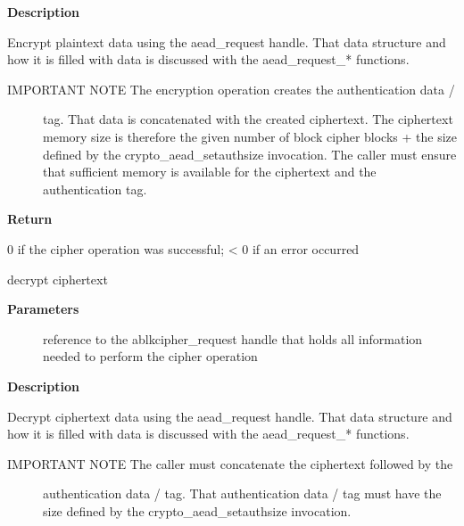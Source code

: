 \documentclass[a4paper,8pt,english]{sphinxmanual}
\begin{document}
\textbf{Description}

Encrypt plaintext data using the aead\_request handle. That data structure
and how it is filled with data is discussed with the aead\_request\_*
functions.
\begin{description}
\item[{IMPORTANT NOTE The encryption operation creates the authentication data /}] \leavevmode
tag. That data is concatenated with the created ciphertext.
The ciphertext memory size is therefore the given number of
block cipher blocks + the size defined by the
crypto\_aead\_setauthsize invocation. The caller must ensure
that sufficient memory is available for the ciphertext and
the authentication tag.

\end{description}

\textbf{Return}

0 if the cipher operation was successful; \textless{} 0 if an error occurred

\begin{fulllineitems}
\label{crypto/api-aead:c.crypto_aead_decrypt}
decrypt ciphertext

\end{fulllineitems}


\textbf{Parameters}
\begin{description}
\item[{}] \leavevmode
reference to the ablkcipher\_request handle that holds all information
needed to perform the cipher operation

\end{description}

\textbf{Description}

Decrypt ciphertext data using the aead\_request handle. That data structure
and how it is filled with data is discussed with the aead\_request\_*
functions.
\begin{description}
\item[{IMPORTANT NOTE The caller must concatenate the ciphertext followed by the}] \leavevmode
authentication data / tag. That authentication data / tag
must have the size defined by the crypto\_aead\_setauthsize
invocation.

\end{description}
\end{document}
